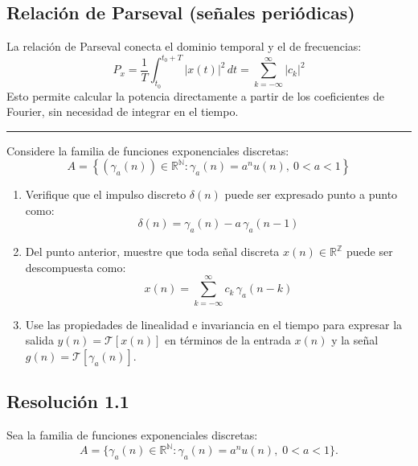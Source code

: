 \documentclass[
  11pt,
  letterpaper,
   addpoints,
   answers
  ]{exam}
\begin{document}
\subsection*{Relación de Parseval (señales periódicas)}
La relación de Parseval conecta el dominio temporal y el de frecuencias:
\begin{equation}
  P_x = \frac{1}{T}\int_{t_0}^{t_0+T} |x(t)|^2\,dt = \sum_{k=-\infty}^{\infty} |c_k|^2
\end{equation}
Esto permite calcular la potencia directamente a partir de los coeficientes de Fourier, sin necesidad de integrar en el tiempo.\\
\noindent\rule{\textwidth}{0.4pt}
\newpage
\begin{questions}
\question
Considere la familia de funciones exponenciales discretas:
\begin{equation}
  A = \left\{ (\gamma_a(n)) \in \mathbb{R}^{\mathbb{N}} : \gamma_a(n) = a^n u(n),\ 0 < a < 1 \right\}
\end{equation}
\begin{enumerate}
  \item Verifique que el impulso discreto $\delta(n)$ puede ser expresado punto a punto como:
  \begin{equation}
    \delta(n) = \gamma_a(n) - a\,\gamma_a(n-1)
  \end{equation}
  \item Del punto anterior, muestre que toda señal discreta $x(n) \in \mathbb{R}^{\mathbb{Z}}$ puede ser descompuesta como:
  \begin{equation}
    x(n) = \sum_{k=-\infty}^{\infty} c_k\,\gamma_a(n-k)
  \end{equation}
  \item Use las propiedades de linealidad e invariancia en el tiempo para expresar la salida $y(n) = \mathcal{T}[x(n)]$ en términos de la entrada $x(n)$ y la señal $g(n) = \mathcal{T}[\gamma_a(n)]$.
\end{enumerate}
\begin{solution}
\subsection*{Resolución 1.1}
Sea la familia de funciones exponenciales discretas:
\begin{equation}
A = \Big\{ \gamma_a(n) \in \mathbb{R}^{\mathbb{N}} : \gamma_a(n) = a^n u(n), \; 0<a<1 \Big\}.
\end{equation}


\end{solution}
\end{questions}
\end{document}
